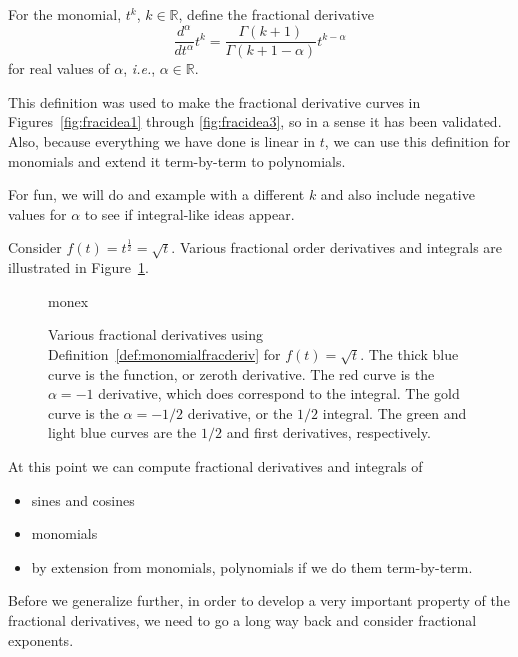 \begin{definition}
  For the monomial, $t^k$, $k \in \mathbb R$, define the fractional derivative 
  \begin{equation}
    \frac{d^\alpha}{dt^\alpha} t^k = \frac{\Gamma\left( k + 1 \right)}{\Gamma \left( k + 1 - \alpha \right)} t^{k - \alpha}
    \label{eq:monomialfrac}
  \end{equation}
  for real values of $\alpha$, \textit{i.e.}, $\alpha \in \mathbb R$.
  \label{def:monomialfracderiv}
\end{definition}

This definition was used to make the fractional derivative curves in Figures~\ref{fig:fracidea1} through
\ref{fig:fracidea3}, so in a sense it has been validated. Also, because everything we have done is linear in $t$, we can
use this definition for monomials and extend it term-by-term to polynomials. 

For fun, we will do and example with a different $k$ and also include negative values for $\alpha$ to see if integral-like ideas appear.

\begin{example}
  Consider $f(t) = t^\frac{1}{2} = \sqrt{t}$. Various fractional order derivatives and integrals are illustrated in Figure~\ref{fig:monex}.

  \begin{figure}
    \centering
    {monex}
    \caption{Various fractional derivatives using Definition~\ref{def:monomialfracderiv} for $f(t) = \sqrt{t}$. The thick blue curve is the function, or zeroth derivative. The red curve is the $\alpha = -1$ derivative, which does correspond to the integral. The gold curve is the $\alpha = -1/2$ derivative, or the $1/2$ integral. The green and light blue curves are the $1/2$ and first derivatives, respectively.}
    \label{fig:monex}
  \end{figure}
\end{example}

At this point we can compute fractional derivatives and integrals of
\begin{itemize}
  \item sines and cosines
  \item monomials
  \item by extension from monomials, polynomials if we do them term-by-term.
\end{itemize}

Before we generalize further, in order to develop a very important property of the fractional derivatives, we need to go a long way back and consider fractional exponents.

